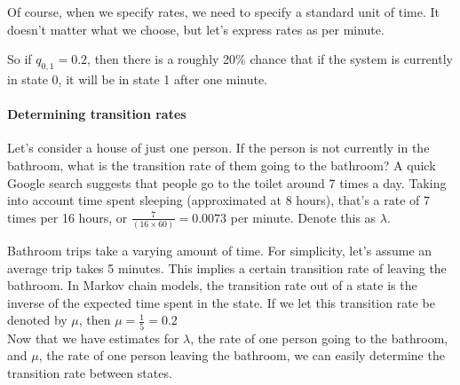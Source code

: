 Of course, when we specify rates, we need to specify a standard unit of time. It doesn't matter what we choose, but let's express rates as per minute. 

So if $q_{0, 1} = 0.2$, then there is a roughly 20\% chance that if the system is currently in state 0, it will be in state 1 after one minute.

\paragraph{Determining transition rates}
Let's consider a house of just one person. If the person is not currently in the bathroom, what is the transition rate of them going to the bathroom? A quick Google search suggests that people go to the toilet around 7 times a day. Taking into account time spent sleeping (approximated at 8 hours), that's a rate of 7 times per 16 hours, or $\frac{7}{(16 \times 60)} = 0.0073$ per minute. Denote this as $\lambda$.

Bathroom trips take a varying amount of time. For simplicity, let's assume an average trip takes 5 minutes. This implies a certain transition rate of leaving the bathroom. In Markov chain models, the transition rate out of a state is the inverse of the expected time spent in the state. If we let this transition rate be denoted by $\mu$, then $\mu = \frac{1}{5} = 0.2 $
\\

Now that we have estimates for $\lambda$, the rate of one person going to the bathroom, and $\mu$, the rate of one person leaving the bathroom, we can easily determine the transition rate between states. 

